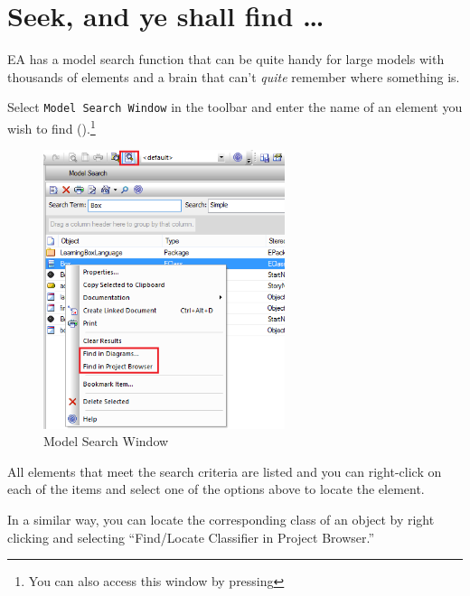\newpage

\hypertarget{subsec:seekAndFind}{}

\section{Seek, and ye shall find \ldots}

EA has a model search function that can be quite handy for large models with thousands of elements and a brain that can't \emph{quite} remember where something
is.

\begin{stepbystep}

\item Select \texttt{Model Search Window} in the toolbar and enter the name of an element you wish to find
().\footnote{You can also access this window by pressing
}

\vspace{0.5cm}

\begin{figure}[htbp]
\begin{center}
  \includegraphics[width=0.63\textwidth]{../../org.moflon.doc.handbook.05_miscellaneous/1_grokkingEA/07_seek/search1}
  \caption{Model Search Window}  
  \label{fig_search01}
\end{center}
\end{figure}

\item All elements that meet the search criteria are listed and you can right-click on each of the items and select one of the options
above to locate the element.

\item In a similar way, you can locate the corresponding class of an object by right clicking and selecting ``Find/Locate Classifier in
Project Browser.''

\vfill

\end{stepbystep}
